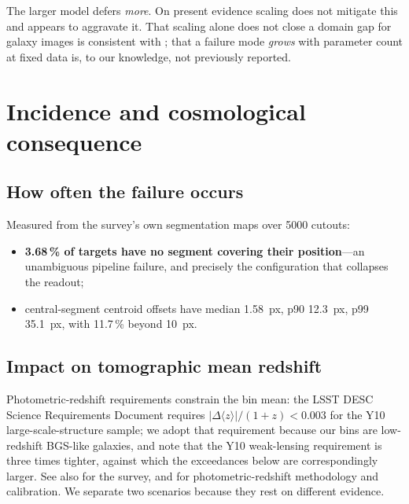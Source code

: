 \documentclass[11pt]{article}
\newcommand{\dzreq}{|\Delta\langle z\rangle|/(1+z)}
\begin{document}
The larger model defers \emph{more}. On present evidence scaling does not mitigate this and
appears to aggravate it. That scaling alone does not close a domain gap for galaxy images is
consistent with \citet{walmsley2024scaling}; that a failure mode \emph{grows} with parameter
count at fixed data is, to our knowledge, not previously reported.

\section{Incidence and cosmological consequence}
\label{sec:impact}

\subsection{How often the failure occurs}

Measured from the survey's own segmentation maps over 5000 cutouts:
\begin{itemize}\itemsep1pt
\item \textbf{3.68\,\% of targets have no segment covering their position}---an unambiguous
pipeline failure, and precisely the configuration that collapses the readout;
\item central-segment centroid offsets have median \SI{1.58}{px}, p90 \SI{12.3}{px}, p99
\SI{35.1}{px}, with 11.7\,\% beyond \SI{10}{px}.
\end{itemize}

\subsection{Impact on tomographic mean redshift}

Photometric-redshift requirements constrain the bin mean: the LSST DESC Science Requirements
Document \citep{lsstdesc2018srd} requires $\dzreq<0.003$ for the Y10 large-scale-structure
sample; we adopt that requirement because our bins are low-redshift BGS-like galaxies, and note
that the Y10 weak-lensing requirement is three times tighter, against which the exceedances
below are correspondingly larger. See also
\citet{ivezic2019lsst,lsstscience2009sciencebook} for the survey, and
\citet{schmidt2020evaluation,benitez2000bayesian,salvato2019flavours,myles2021redshift} for
photometric-redshift methodology and calibration. We separate two scenarios because they rest on
different evidence.
\end{document}
